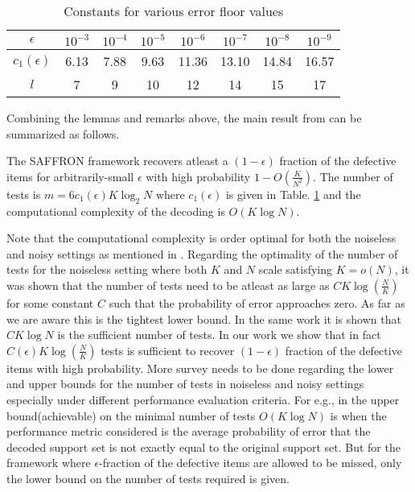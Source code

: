 \documentclass[conference,twocolumn]{IEEEtran}
\begin{document}
\begin{table}[t]
\centering
\label{Table:constantsDE}
\begin{tabular}{| c | c | c | c | c | c | c | c | }
\hline
$\epsilon$ & $10^{-3}$ & $10^{-4}$ & $10^{-5}$ & $10^{-6}$ &$ 10^{-7}$ & $10^{-8}$ & $10^{-9}$ \\ \hline
$c_1(\epsilon)$ & 6.13 & 7.88 & 9.63 & 11.36 & 13.10 & 14.84 & 16.57 \\ \hline
 $l$ & 7 & 9 & 10 & 12 & 14 & 15 & 17 \\ \hline
\end{tabular}
\vspace{1ex}
\caption{Constants for various error floor values}
\end{table}
Combining the lemmas and remarks above, the main result from \cite{lee2015saffron} can be summarized as follows.
\begin{theorem}
The SAFFRON framework recovers atleast a $(1-\epsilon)$ fraction of the defective items for arbitrarily-small $\epsilon$ with high probability $1-O(\frac{K}{N^2})$. The number of tests is $m=6c_1(\epsilon)K \log_{2}N$ where $c_1(\epsilon)$ is given in Table. \ref{Table:constantsDE} and the computational complexity of the decoding is $O(K\log N)$.
\end{theorem}
Note that the computational complexity is order optimal for both the noiseless and noisy settings as mentioned in \cite{lee2015saffron}. Regarding the optimality of the number of tests for the noiseless setting where both $K$ and $N$ scale satisfying $K=o(N)$, it was shown \cite{atia2012boolean} that the number of tests need to be atleast as large as $C K \log (\frac{N}{K})$ for some constant $C$ such that the probability of error approaches zero. As far as we are aware this is the tightest lower bound. In the same work it is shown that $C K \log N$ is the sufficient number of tests. In our work we show that in fact $C(\epsilon) K \log(\frac{N}{K})$ tests is sufficient to recover $(1-\epsilon)$ fraction of the defective items with high probability. More survey needs to be done regarding the lower and upper bounds for the number of tests in noiseless and noisy settings especially under different performance evaluation criteria. For e.g., in \cite{atia2012boolean} the upper bound(achievable) on the minimal number of tests $O(K \log N)$ is when the performance metric considered is the average probability of error that the decoded support set is not exactly equal to the original support set. But for the framework where $\epsilon$-fraction of the defective items are allowed to be missed, only the lower bound on the number of tests required is given. 
\end{document}
